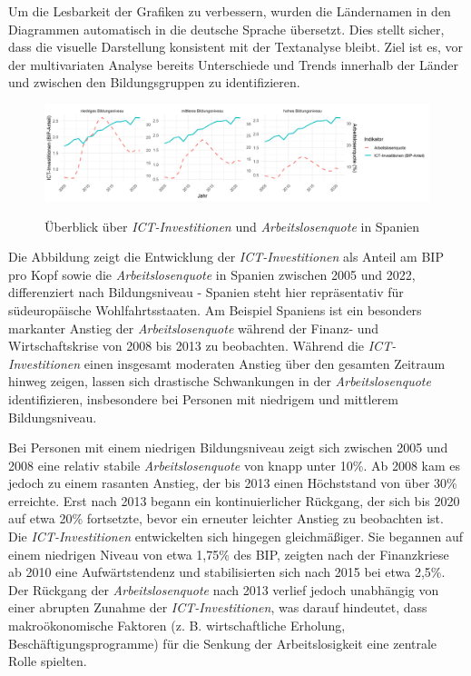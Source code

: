 Um die Lesbarkeit der Grafiken zu verbessern, wurden die Ländernamen in den Diagrammen 
automatisch in die deutsche Sprache übersetzt. Dies stellt sicher, dass die visuelle Darstellung 
konsistent mit der Textanalyse bleibt. Ziel ist es, vor der multivariaten Analyse bereits 
Unterschiede und Trends innerhalb der Länder und zwischen den Bildungsgruppen zu identifizieren.

\begin{figure}[H]
    \centering
    \caption{Überblick über \textit{\ac{ICT}-Investitionen} und \textit{Arbeitslosenquote} in 
    Spanien}
    \includegraphics[width=\textwidth]{assets/plot_spain_final.png}
    \label{fig:spain}
\end{figure}

Die Abbildung zeigt die Entwicklung der \textit{\ac{ICT}-Investitionen} als Anteil am \ac{BIP} 
pro Kopf sowie die \textit{Arbeitslosenquote} in Spanien zwischen 2005 und 2022, differenziert 
nach Bildungsniveau - Spanien steht hier repräsentativ für südeuropäische Wohlfahrtsstaaten. Am 
Beispiel Spaniens ist ein besonders markanter Anstieg der \textit{Arbeitslosenquote} während der 
Finanz- und Wirtschaftskrise von 2008 bis 2013 zu beobachten. Während die 
\textit{\ac{ICT}-Investitionen} einen insgesamt moderaten Anstieg über den gesamten Zeitraum 
hinweg zeigen, lassen sich drastische Schwankungen in der \textit{Arbeitslosenquote} 
identifizieren, insbesondere bei Personen mit niedrigem und mittlerem Bildungsniveau.

Bei Personen mit einem niedrigen Bildungsniveau zeigt sich zwischen 2005 und 2008 eine relativ 
stabile \textit{Arbeitslosenquote} von knapp unter 10\%. Ab 2008 kam es jedoch zu einem rasanten 
Anstieg, der bis 2013 einen Höchststand von über 30\% erreichte. Erst nach 2013 begann ein 
kontinuierlicher Rückgang, der sich bis 2020 auf etwa 20\% fortsetzte, bevor ein erneuter 
leichter Anstieg zu beobachten ist. Die \textit{\ac{ICT}-Investitionen} entwickelten sich 
hingegen gleichmäßiger. Sie begannen auf einem niedrigen Niveau von etwa 1,75\% des BIP, zeigten 
nach der Finanzkriese ab 2010 eine Aufwärtstendenz und stabilisierten sich nach 2015 bei etwa 
2,5\%. Der Rückgang der \textit{Arbeitslosenquote} nach 2013 verlief jedoch unabhängig von einer 
abrupten Zunahme der \textit{\ac{ICT}-Investitionen}, was darauf hindeutet, dass makroökonomische 
Faktoren (z. B. wirtschaftliche Erholung, Beschäftigungsprogramme) für die Senkung der 
Arbeitslosigkeit eine zentrale Rolle spielten.

